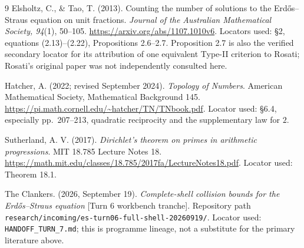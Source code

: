 \begin{thebibliography}{9}
Elsholtz, C., \& Tao, T. (2013).
Counting the number of solutions to the Erd\H{o}s--Straus equation on unit fractions.
\emph{Journal of the Australian Mathematical Society, 94}(1), 50--105.
\url{https://arxiv.org/abs/1107.1010v6}.
Locators used: \S2, equations (2.13)--(2.22), Propositions 2.6--2.7.
Proposition 2.7 is also the verified secondary locator for its attribution of
one equivalent Type-II criterion to Rosati; Rosati's original paper was not
independently consulted here.

Hatcher, A. (2022; revised September 2024).
\emph{Topology of Numbers}.
American Mathematical Society, Mathematical Background 145.
\url{https://pi.math.cornell.edu/~hatcher/TN/TNbook.pdf}.
Locator used: \S6.4, especially pp.~207--213, quadratic reciprocity and the
supplementary law for $2$.

Sutherland, A. V. (2017).
\emph{Dirichlet's theorem on primes in arithmetic progressions}.
MIT 18.785 Lecture Notes 18.
\url{https://math.mit.edu/classes/18.785/2017fa/LectureNotes18.pdf}.
Locator used: Theorem 18.1.

The Clankers. (2026, September 19).
\emph{Complete-shell collision bounds for the Erd\H{o}s--Straus equation}
[Turn 6 workbench tranche].
Repository path
\texttt{research/incoming/es-turn06-full-shell-20260919/}.
Locator used: \texttt{HANDOFF\_TURN\_7.md}; this is programme lineage, not a
substitute for the primary literature above.
\end{thebibliography}
